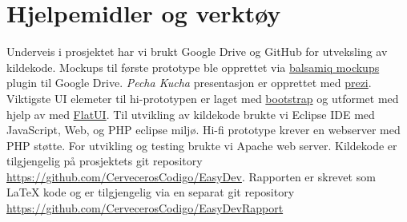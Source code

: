 \section{Hjelpemidler og verktøy} \label{sec:hjelpogverkt}
Underveis i prosjektet har vi brukt Google Drive og GitHub for utveksling av kildekode. Mockups til første prototype ble opprettet via \href{https://balsamiq.com/}{balsamiq mockups} plugin til Google Drive. \textit{Pecha Kucha} presentasjon er opprettet med \href{https://prezi.com/z_1ipfrf4m_3/skolelinux-pa-ny-mate/}{prezi}. Viktigste UI elemeter til hi-prototypen er laget med \href{http://getbootstrap.com/}{bootstrap} og utformet med hjelp av med \href{http://designmodo.github.io/Flat-UI/}{FlatUI}. Til utvikling av kildekode brukte vi Eclipse IDE med JavaScript, Web, og PHP eclipse miljø. Hi-fi prototype krever en webserver med PHP støtte. For utvikling og testing brukte vi Apache web server. Kildekode er tilgjengelig på prosjektets git repository
\href{https://github.com/CervecerosCodigo/EasyDev}{https://github.com/CervecerosCodigo/EasyDev}.
Rapporten er skrevet som \LaTeX{} kode og er tilgjengelig via en separat git repository \\ \href{https://github.com/CervecerosCodigo/EasyDevRapport}{https://github.com/CervecerosCodigo/EasyDevRapport}

